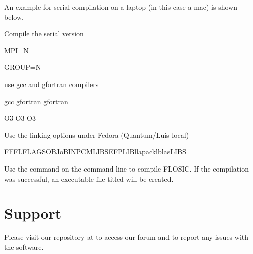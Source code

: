 \documentclass[letterpaper,10pt,english,openany,oneside]{sphinxmanual}
\begin{document}
\sphinxAtStartPar
An example for serial compilation on a laptop (in this case a mac) is shown below.

\sphinxAtStartPar
{} Compile the serial version

\sphinxAtStartPar
MPI=N

\sphinxAtStartPar
GROUP=N

\sphinxAtStartPar
{} use gcc and gfortran compilers

\begin{sphinxVerbatim}[commandchars=\\\{\}]
gcc
gfortran
gfortran

\PYGZhy{}O3
\PYGZhy{}O3
\PYGZhy{}O3
\end{sphinxVerbatim}

\sphinxAtStartPar
{} Use the linking options under Fedora (Quantum/Luis local)

\begin{sphinxVerbatim}[commandchars=\\\{\}]
FFFLFLAGSOBJ\PYGZhy{}oBINPCM\PYGZus{}LIBSEFP\PYGZus{}LIB\PYGZhy{}llapack\PYGZhy{}lblasLIBS
\end{sphinxVerbatim}

\sphinxAtStartPar
Use the  command on the command line to compile FLOSIC. If the compilation was successful, an executable file titled  will be created.

\sphinxstepscope


\section{Support}
\label{\detokenize{docs/install/Support:support}}\label{\detokenize{docs/install/Support::doc}}
\sphinxAtStartPar
Please visit our repository at  to access
our  forum and to report any issues with the software.
\end{document}
